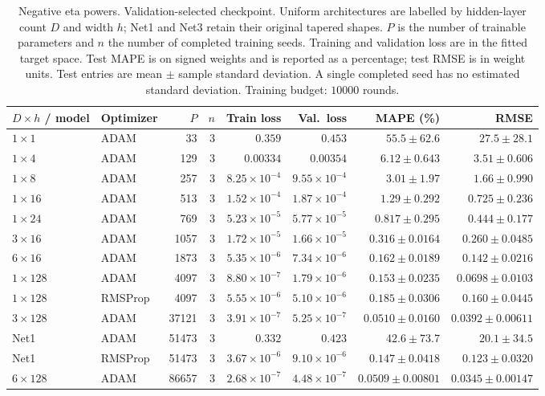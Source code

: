 \begin{table}[!htbp]
\centering
\small
\setlength{\tabcolsep}{4pt}
\renewcommand{\arraystretch}{1.18}
\begin{tabular}{@{}llrrrrrr@{}}
\toprule
$D\times h$ / model & Optimizer & $P$ & $n$ & Train loss & Val.\ loss & MAPE (\%) & RMSE \\
\midrule
$1\times 1$ & ADAM & 33 & 3 & $0.359$ & $0.453$ & $55.5\pm62.6$ & $27.5\pm28.1$ \\
$1\times 4$ & ADAM & 129 & 3 & $0.00334$ & $0.00354$ & $6.12\pm0.643$ & $3.51\pm0.606$ \\
$1\times 8$ & ADAM & 257 & 3 & $8.25\times10^{-4}$ & $9.55\times10^{-4}$ & $3.01\pm1.97$ & $1.66\pm0.990$ \\
$1\times 16$ & ADAM & 513 & 3 & $1.52\times10^{-4}$ & $1.87\times10^{-4}$ & $1.29\pm0.292$ & $0.725\pm0.236$ \\
$1\times 24$ & ADAM & 769 & 3 & $5.23\times10^{-5}$ & $5.77\times10^{-5}$ & $0.817\pm0.295$ & $0.444\pm0.177$ \\
$3\times 16$ & ADAM & 1057 & 3 & $1.72\times10^{-5}$ & $1.66\times10^{-5}$ & $0.316\pm0.0164$ & $0.260\pm0.0485$ \\
$6\times 16$ & ADAM & 1873 & 3 & $5.35\times10^{-6}$ & $7.34\times10^{-6}$ & $0.162\pm0.0189$ & $0.142\pm0.0216$ \\
$1\times 128$ & ADAM & 4097 & 3 & $8.80\times10^{-7}$ & $1.79\times10^{-6}$ & $0.153\pm0.0235$ & $0.0698\pm0.0103$ \\
$1\times 128$ & RMSProp & 4097 & 3 & $5.55\times10^{-6}$ & $5.10\times10^{-6}$ & $0.185\pm0.0306$ & $0.160\pm0.0445$ \\
$3\times 128$ & ADAM & 37121 & 3 & $3.91\times10^{-7}$ & $5.25\times10^{-7}$ & $0.0510\pm0.0160$ & $0.0392\pm0.00611$ \\
Net1 & ADAM & 51473 & 3 & $0.332$ & $0.423$ & $42.6\pm73.7$ & $20.1\pm34.5$ \\
Net1 & RMSProp & 51473 & 3 & $3.67\times10^{-6}$ & $9.10\times10^{-6}$ & $0.147\pm0.0418$ & $0.123\pm0.0320$ \\
$6\times 128$ & ADAM & 86657 & 3 & $2.68\times10^{-7}$ & $4.48\times10^{-7}$ & $0.0509\pm0.00801$ & $0.0345\pm0.00147$ \\
\bottomrule
\end{tabular}
\caption{\textsf{Negative eta powers. Validation-selected checkpoint. Uniform architectures are labelled by hidden-layer count $D$ and width $h$; Net1 and Net3 retain their original tapered shapes. $P$ is the number of trainable parameters and $n$ the number of completed training seeds. Training and validation loss are in the fitted target space. Test MAPE is on signed weights and is reported as a percentage; test RMSE is in weight units. Test entries are mean $\pm$ sample standard deviation. A single completed seed has no estimated standard deviation. Training budget: $10000$ rounds.}}
\label{tab:depth-eta-negative-best}
\end{table}

